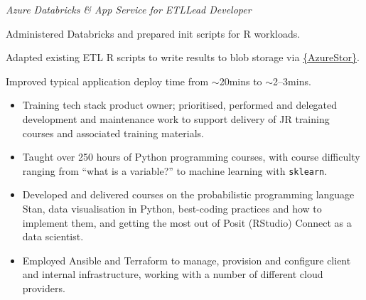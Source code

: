 \documentclass[12pt, a4paper]{article}
\begin{document}
%
       {\emph{Azure Databricks \& App Service for ETL\hfill{}Lead Developer}

       \begin{adjustwidth}{0em}{3em}

       Administered Databricks and prepared init scripts for R workloads.

       Adapted existing ETL R scripts to write results to blob storage via
       \href{https://cran.r-project.org/web/packages/AzureStor/vignettes/intro.html}%
            {\{AzureStor\}}.

       Improved typical application deploy time from $\sim$20mins to $\sim$2--3mins.

       \end{adjustwidth}}%

\vspace{-.4em}


\begin{itemize}[
    itemsep=.2em,
    labelwidth=2em,
    leftmargin=3.25em,
    topsep=0em]

     \item[\faIcon{layer-group}]%
       {Training tech stack product owner; prioritised, performed and delegated development and
       maintenance work to support delivery of JR training courses and associated training
       materials.}

     \item[\faIcon{python}]%
       {Taught over 250 hours of Python programming courses, with course difficulty
        ranging from ``what is a variable?'' to machine learning with \texttt{sklearn}.}%

     \item[\faIcon{chalkboard-teacher}]%
       {Developed and delivered courses on the probabilistic programming
        language Stan, data visualisation in Python, best-coding practices and how to
        implement them, and getting the most out of Posit (RStudio) Connect as a data
        scientist.}%

    \item[\faIcon{cloud}]%
       {Employed Ansible and Terraform to manage, provision and configure client and
        internal infrastructure, working with a number of different cloud providers.}%

\end{itemize}

\clearpage
\end{document}
